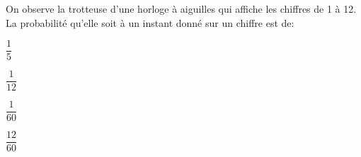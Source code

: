 \begin{QCM}
\begin{EnonceCommunQCM}

\end{EnonceCommunQCM}
\begin{GroupeQCM}
\begin{exercice}On observe la trotteuse d'une horloge à aiguilles qui affiche les chiffres de 1 à 12. \\La probabilité qu'elle soit à un instant donné sur un chiffre est de:
\begin{ChoixQCM}{4}
\item $\dfrac{1}{5}$
\item $\dfrac{1}{12}$
\item $\dfrac{1}{60}$
\item $\dfrac{12}{60}$
\end{ChoixQCM}
 \begin{corrige}
    \end{corrige}
\end{exercice}

\end{GroupeQCM}
\end{QCM}

